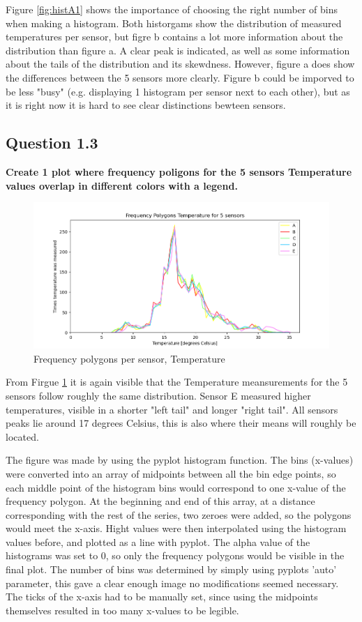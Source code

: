 \documentclass{report}
\begin{document}
	Figure \ref{fig:histA1} shows the importance of choosing the right number of bins when making a histogram. Both historgams show the distribution of measured temperatures per sensor, but figre b contains a lot more information about the distribution than figure a. A clear peak is indicated, as well as some information about the tails of the distribution and its skewdness. However, figure a does show the differences between the 5 sensors more clearly. Figure b could be imporved to be less "busy" (e.g. displaying 1 histogram per sensor next to each other), but as it is right now it is hard to see clear distinctions bewteen sensors.
	
	\subsection{Question 1.3}
	\textbf{Create 1 plot where frequency poligons for the 5 sensors Temperature values overlap in different colors with a legend.}
	
	\begin{figure}[h!]
		\includegraphics[width=\linewidth]{GEO1001_hw01_images/GEO1001_hw01_A1_polygons.png}
		\caption{Frequency polygons per sensor, Temperature}
		\label{fig:freqpols}
	\end{figure}

	From Firgue \ref{fig:freqpols} it is again visible that the Temperature meansurements for the 5 sensors follow roughly the same distribution. Sensor E measured higher temperatures, visible in a shorter "left tail" and longer "right tail". All sensors peaks lie around 17 degrees Celsius, this is also where their means will roughly be located.
	
	The figure was made by using the pyplot histogram function. The bins (x-values) were converted into an array of midpoints between all the bin edge points, so each middle point of the histogram bins would correspond to one x-value of the frequency polygon. At the beginning and end of this array, at a distance corresponding with the rest of the series, two zeroes were added, so the polygons would meet the x-axis. Hight values were then interpolated using the histogram values before, and plotted as a line with pyplot. The alpha value of the histograms was set to 0, so only the frequency polygons would be visible in the final plot. The number of bins was determined by simply using pyplots 'auto' parameter, this gave a clear enough image no modifications seemed necessary. The ticks of the x-axis had to be manually set, since using the midpoints themselves resulted in too many x-values to be legible.
	
\end{document}
